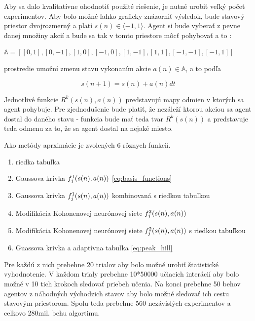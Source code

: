 Aby sa dalo kvalitatívne ohodnotiť použité riešenie, je nutné urobiť veľký počet experimentov.
Aby bolo možné ľahko graficky znázorniť výsledok, bude stavový priestor dvojrozmerný a platí
$s(n) \in \langle -1, 1 \rangle$.
Agent si bude vyberať z pevne danej množiny akcií a bude sa tak v tomto priestore môcť pohybovať a to :

$\mathbb{A} = [ [0, 1], [0, -1], [1,  0], [-1, 0], [1, -1], [1, 1], [-1, -1], [-1, 1]] $

prostredie umožní zmenu stavu vykonaním akcie $a(n) \in \mathbb{A}$, a to podľa

\begin{equation}
s(n+1) = s(n) + a(n){dt}
\label{eq:q_learning_next_state}
\end{equation}

Jednotlivé funkcie $R^k(s(n), a(n))$ predstavujú mapy odmien v ktorých sa agent pohybuje. Pre zjednodušenie
bude platiť, že nezáleží ktorou akciou sa agent dostal do daného stavu - funkcia bude
mať teda tvar $R^k(s(n))$ a predstavuje teda odmenu za to, že sa agent dostal na nejaké miesto.

Ako metódy aprximácie je zvolených 6 rôznych funkcií.

\begin{enumerate}
\item riedka tabuľka
\item Gaussova krivka $f_j^1(\boldmath{s(n), a(n)})$ \ref{eq:basis_functions}
\item Gaussova krivka $f_j^1(\boldmath{s(n), a(n)})$ kombinovaná s riedkou tabuľkou
\item Modifikácia Kohonenovej neurónovej siete $f_j^2(\boldmath{s(n), a(n)})$
\item Modifikácia Kohonenovej neurónovej siete $f_j^2(\boldmath{s(n), a(n)})$ s riedkou tabuľkou
\item Guassova krivka a adaptívna tabuľka \ref{eq:peak_hill}
\end{enumerate}

Pre každú z nich prebehne 20 trialov aby bolo možné urobiť štatistické vyhodnotenie.
V každom trialy prebehne 10*50000 učiacich interácií aby bolo možné v 10 tich krokoch sledovať
priebeh učenia. Na konci prebehne 50 behov agentov z náhodných východzich stavov aby bolo
možné sledovať ich cestu stavovým priestorom. Spolu teda prebehne 560 nezávislých experimentov
a celkovo 280mil. behu algortimu.

